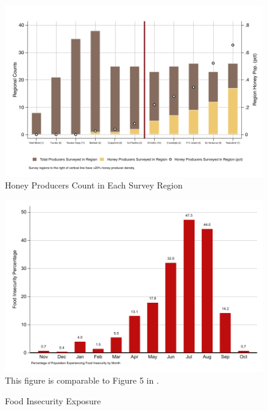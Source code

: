 \documentclass[../main.tex]{subfiles}
\begin{document}
\begin{figure}[h!]
    \centering
    \caption{Honey Producers Count in Each Survey Region}
    \label{fig:graph_honey_regional_counts}    
    \includegraphics[width=1\textwidth]{project/figures/pdf/graph_honey_regional_counts.pdf}
\end{figure}

\begin{figure}[h!]
    \centering
    \caption{Food Insecurity Exposure}
    \label{fig:graph_food_insecurity_exposure}    \includegraphics[width=1\textwidth]{project/figures/pdf/graph_food_insecurity_exposure.pdf}
    This figure is comparable to Figure 5 in \textcite{anderzenEffectsOnfarmDiversification2020}.
\end{figure}
\end{document}
